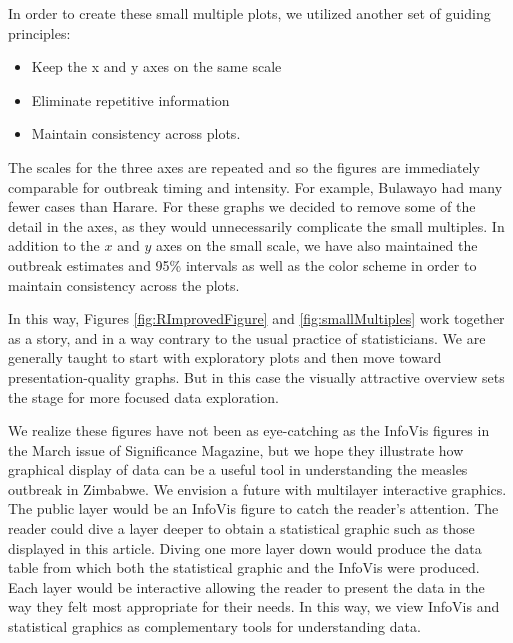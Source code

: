 \documentclass[12pt]{article}
\begin{document}
In order to create these small multiple plots, we utilized another set of guiding principles:
\begin{itemize}
\item Keep the x and y axes on the same scale
\item Eliminate repetitive information
\item Maintain consistency across plots.
\end{itemize}
The scales for the three axes are repeated and so the figures are immediately comparable for outbreak timing and intensity.  For example, Bulawayo had many fewer cases than Harare.  For these graphs we decided to remove some of the detail in the axes, as they would unnecessarily complicate the small multiples.  In addition to the $x$ and $y$ axes on the small scale, we have also maintained the outbreak estimates and 95\% intervals as well as the color scheme in order to maintain consistency across the plots.

In this way, Figures \ref{fig:RImprovedFigure} and \ref{fig:smallMultiples} work together as a story, and in a way contrary to the usual practice of statisticians.  We are generally taught to start with exploratory plots and then move toward presentation-quality graphs.  But in this case the visually attractive overview sets the stage for more focused data exploration.

We realize these figures have not been as eye-catching as the InfoVis figures in the March issue of Significance Magazine, but we hope they illustrate how graphical display of data can be a useful tool in understanding the measles outbreak in Zimbabwe.  We envision a future with multilayer interactive graphics. The public layer would be an InfoVis figure to catch the reader's attention. The reader could dive a layer deeper to obtain a statistical graphic such as those displayed in this article. Diving one more layer down would produce the data table from which both the statistical graphic and the InfoVis were produced. Each layer would be interactive allowing the reader to present the data in the way they felt most appropriate for their needs. In this way, we view InfoVis and statistical graphics as complementary tools for understanding data.
\end{document}
